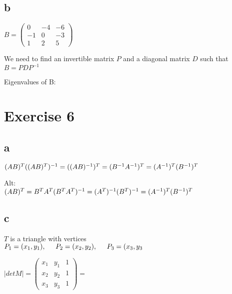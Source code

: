 \documentclass{article}
\begin{document}
\subsection*{b}

$B =
\left (
	\begin{matrix}
		0 & -4 & -6\\
		-1 & 0 & -3\\
		1 & 2 & 5
	\end{matrix}
\right )
$

We need to find an invertible matrix $P$ and a diagonal matrix $D$ such that $B = PDP^{-1}$

Eigenvalues of B:


\newpage
\section*{Exercise 6}

\subsection*{a}
$
(AB)^{T}\\
((AB)^{T})^{-1} = \\
((AB)^{-1})^{T} = \\
(B^{-1}A^{-1})^{T} = \\
(A^{-1})^{T}(B^{-1})^{T}
$

Alt:\\
$
(AB)^{T} = B^{T}A^{T}\\
(B^{T}A^{T})^{-1} = \\
(A^{T})^{-1}(B^{T})^{-1} = \\
(A^{-1})^{T}(B^{-1})^{T}
$

\subsection*{c}

$T$ is a triangle with vertices\\
$P_{1} = (x_{1}, y_{1}), \hspace{5 mm}
P_{2} = (x_{2}, y_{2}), \hspace{5 mm}
P_{3} = (x_{3}, y_{3}
$

$|detM| =
\left (
	\begin{matrix}
		x_{1} & y_{1} & 1\\
		x_{2} & y_{2} & 1\\
		x_{3} & y_{3} & 1
	\end{matrix}
\right )
=
$
\end{document}
